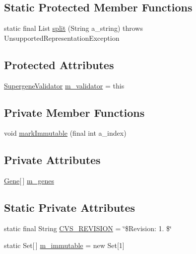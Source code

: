 \subsection*{Static Protected Member Functions}
\begin{DoxyCompactItemize}
\item 
static final List \hyperlink{classorg_1_1jgap_1_1supergenes_1_1_abstract_supergene_a3ff87dbb7c5c6a4167198184b7171934}{split} (String a\-\_\-string)  throws Unsupported\-Representation\-Exception 
\end{DoxyCompactItemize}
\subsection*{Protected Attributes}
\begin{DoxyCompactItemize}
\item 
\hyperlink{interfaceorg_1_1jgap_1_1supergenes_1_1_supergene_validator}{Supergene\-Validator} \hyperlink{classorg_1_1jgap_1_1supergenes_1_1_abstract_supergene_a8792c7c19ad0cdb48ade652a110a9016}{m\-\_\-validator} = this
\end{DoxyCompactItemize}
\subsection*{Private Member Functions}
\begin{DoxyCompactItemize}
\item 
void \hyperlink{classorg_1_1jgap_1_1supergenes_1_1_abstract_supergene_a9f06a4d966c9e615b2ea5bff4583a183}{mark\-Immutable} (final int a\-\_\-index)
\end{DoxyCompactItemize}
\subsection*{Private Attributes}
\begin{DoxyCompactItemize}
\item 
\hyperlink{interfaceorg_1_1jgap_1_1_gene}{Gene}\mbox{[}$\,$\mbox{]} \hyperlink{classorg_1_1jgap_1_1supergenes_1_1_abstract_supergene_a7e237a04c314d9fbb0ab064ad88a5cb3}{m\-\_\-genes}
\end{DoxyCompactItemize}
\subsection*{Static Private Attributes}
\begin{DoxyCompactItemize}
\item 
static final String \hyperlink{classorg_1_1jgap_1_1supergenes_1_1_abstract_supergene_a9084146c063a12faff254011968f40b8}{C\-V\-S\-\_\-\-R\-E\-V\-I\-S\-I\-O\-N} = \char`\"{}\$Revision\-: 1. \$\char`\"{}
\item 
static Set\mbox{[}$\,$\mbox{]} \hyperlink{classorg_1_1jgap_1_1supergenes_1_1_abstract_supergene_a92632c12f27c0aaef1984c8550afe9a1}{m\-\_\-immutable} = new Set\mbox{[}1\mbox{]}
\end{DoxyCompactItemize}


